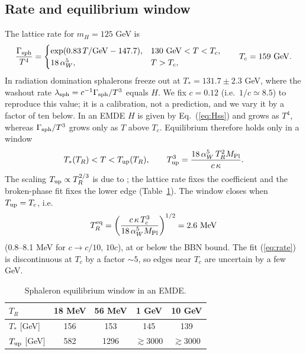 \documentclass[11pt]{article}
\newcommand{\Mpl}{M_{\rm Pl}}
\begin{document}
\subsection{Rate and equilibrium window}
The lattice rate for $m_H=125$ GeV is \cite{DRT14}
\begin{equation}
\frac{\Gamma_{\rm sph}}{T^4}=\begin{cases}\exp(0.83\,T/{\rm GeV}-147.7), & 130\ {\rm GeV}<T<T_c,\\ 18\,\alpha_W^5,& T>T_c,\end{cases}\qquad T_c=159\ {\rm GeV}.
\label{eq:rate}
\end{equation}
In radiation domination sphalerons freeze out at $T_*=131.7\pm2.3$ GeV, where the washout rate $\lambda_{\rm sph}=c^{-1}\Gamma_{\rm sph}/T^3$ equals $H$. We fix $c=0.12$ (i.e.\ $1/c\simeq8.5$) to reproduce this value; it is a calibration, not a prediction, and we vary it by a factor of ten below. In an EMDE $H$ is given by Eq.~(\ref{eq:Hss}) and grows as $T^4$, whereas $\Gamma_{\rm sph}/T^3$ grows only as $T$ above $T_c$. Equilibrium therefore holds only in a window
\begin{equation}
T_*(T_R)<T<T_{\rm up}(T_R),\qquad T_{\rm up}^3=\frac{18\,\alpha_W^5\,T_R^2\Mpl}{c\,\kappa}.
\label{eq:window}
\end{equation}
The scaling $T_{\rm up}\propto T_R^{2/3}$ is due to \cite{DLR}; the lattice rate fixes the coefficient and the broken-phase fit fixes the lower edge (Table~\ref{tab:window}). The window closes when $T_{\rm up}=T_c$, i.e.
\begin{equation}
T_R^{\rm eq}=\left(\frac{c\,\kappa\,T_c^3}{18\,\alpha_W^5\Mpl}\right)^{1/2}=2.6\ {\rm MeV}
\end{equation}
(0.8--8.1 MeV for $c\to c/10,\,10c$), at or below the BBN bound. The fit (\ref{eq:rate}) is discontinuous at $T_c$ by a factor $\sim5$, so edges near $T_c$ are uncertain by a few GeV.

\begin{table}[h]\centering
\begin{tabular}{lcccc}\toprule
$T_R$ & 18 MeV & 56 MeV & 1 GeV & 10 GeV\\ \midrule
$T_*$ [GeV] & 156 & 153 & 145 & 139\\
$T_{\rm up}$ [GeV] & 582 & 1296 & $\gtrsim3000$ & $\gtrsim3000$\\ \bottomrule
\end{tabular}
\caption{Sphaleron equilibrium window in an EMDE.}\label{tab:window}\end{table}
\end{document}
